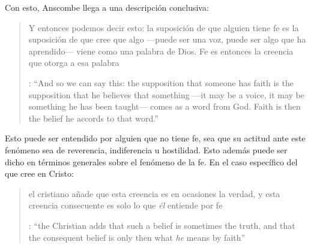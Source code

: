 Con esto, Anscombe llega a una descripción conclusiva: \blockquote[{\cite[119--120]{anscombe1981erp:faith}}: \enquote{And so we can say this: the supposition that someone has faith is the supposition that he believes that something ---it may be a voice, it may be something he has been taught--- comes as a word from God. Faith is then the belief he accords to that word.}]{Y entonces podemos decir esto: la suposición de que alguien tiene fe es la suposición de que cree que algo ---puede ser una voz, puede ser algo que ha aprendido--- viene como una palabra de Dios. Fe es entonces la creencia que otorga a esa palabra}. Esto puede ser entendido por alguien que no tiene fe, sea que su actitud ante este fenómeno sea de reverencia, indiferencia u hostilidad. Esto además puede ser dicho en términos generales sobre el fenómeno de la fe. En el caso específico del que cree en Cristo: \blockquote[{\cite[120]{anscombe1981erp:faith}}: \enquote{the Christian adds that such a belief is sometimes the truth, and that the consequent belief is only then what \emph{he} means by faith}]{el cristiano añade que esta creencia es en ocasiones la verdad, y esta creencia consecuente es solo lo que \emph{él} entiende por fe}.
